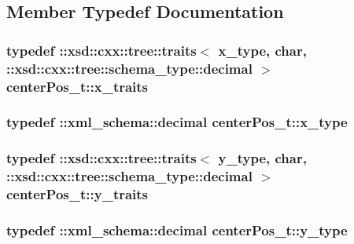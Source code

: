 \subsection{Member Typedef Documentation}
\hypertarget{classcenterPos__t_ab983e22a2d65a5fd634f53910e7ee483}{
\subsubsection[{x\-\_\-traits}]{\setlength{\rightskip}{0pt plus 5cm}typedef \-::xsd\-::cxx\-::tree\-::traits$<$ {\bf x\-\_\-type}, char, \-::xsd\-::cxx\-::tree\-::schema\-\_\-type\-::decimal $>$ {\bf center\-Pos\-\_\-t\-::x\-\_\-traits}}}\label{classcenterPos__t_ab983e22a2d65a5fd634f53910e7ee483}
\hypertarget{classcenterPos__t_ad9202ab9a64d0ac44ac212e2b8ad52f9}{
\subsubsection[{x\-\_\-type}]{\setlength{\rightskip}{0pt plus 5cm}typedef \-::{\bf xml\-\_\-schema\-::decimal} {\bf center\-Pos\-\_\-t\-::x\-\_\-type}}}\label{classcenterPos__t_ad9202ab9a64d0ac44ac212e2b8ad52f9}
\hypertarget{classcenterPos__t_a3a852dc42bb49f7aba36332b422e9430}{
\subsubsection[{y\-\_\-traits}]{\setlength{\rightskip}{0pt plus 5cm}typedef \-::xsd\-::cxx\-::tree\-::traits$<$ {\bf y\-\_\-type}, char, \-::xsd\-::cxx\-::tree\-::schema\-\_\-type\-::decimal $>$ {\bf center\-Pos\-\_\-t\-::y\-\_\-traits}}}\label{classcenterPos__t_a3a852dc42bb49f7aba36332b422e9430}
\hypertarget{classcenterPos__t_a729ec04aac9d1066004b319cca2879fd}{
\subsubsection[{y\-\_\-type}]{\setlength{\rightskip}{0pt plus 5cm}typedef \-::{\bf xml\-\_\-schema\-::decimal} {\bf center\-Pos\-\_\-t\-::y\-\_\-type}}}\label{classcenterPos__t_a729ec04aac9d1066004b319cca2879fd}
